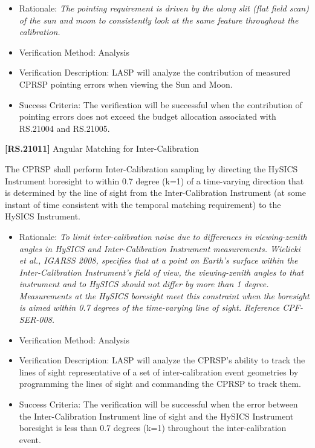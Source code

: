 \documentclass[12pt,oneside,oldfontcommands]{memoir}
\begin{document}
\begin{itemize}
\item{} Rationale: \emph{The pointing requirement is driven by the along slit (flat field scan) of the sun and moon to consistently look at the same feature throughout the calibration.}

\item{} Verification Method: Analysis

\item{} Verification Description: \gls{LASP} will analyze the contribution of \gls{measure}d \gls{CPRSP} \gls{point}ing errors when viewing the Sun and Moon.

\item{} Success Criteria: The verification will be successful when the contribution of \gls{point}ing errors does not exceed the budget allocation associated with \gls{RS}.21004 and \gls{RS}.21005.

\end{itemize}

\textbf{[RS.21011]} Angular Matching for Inter-Calibration

The \gls{CPRSP} shall perform Inter-Calibration sampling by directing the \gls{HySICS} Instrument boresight to within 0.7 degree (k=1) of a time-varying direction that is determined by the line of sight from the Inter-Calibration Instrument (at some instant of time consistent with the temporal matching requirement) to the \gls{HySICS} Instrument.

\begin{itemize}
\item{} Rationale: \emph{To limit inter-calibration noise due to differences in viewing-zenith angles in HySICS and Inter-Calibration Instrument measurements. Wielicki et al., IGARSS 2008, specifies that at a point on Earth's surface within the Inter-Calibration Instrument's field of view, the viewing-zenith angles to that instrument and to HySICS should not differ by more than 1 degree. Measurements at the HySICS boresight meet this constraint when the boresight is aimed within 0.7 degrees of the time-varying line of sight. Reference CPF-SER-008.}

\item{} Verification Method: Analysis

\item{} Verification Description: \gls{LASP} will analyze the \gls{CPRSP}'s ability to track the lines of sight representative of a set of inter-calibration event geometries by programming the lines of sight and commanding the \gls{CPRSP} to track them.

\item{} Success Criteria: The verification will be successful when the error between the Inter-Calibration Instrument line of sight and the \gls{HySICS} Instrument boresight is less than 0.7 degrees (k=1) throughout the inter-calibration event.

\end{itemize}
\end{document}
